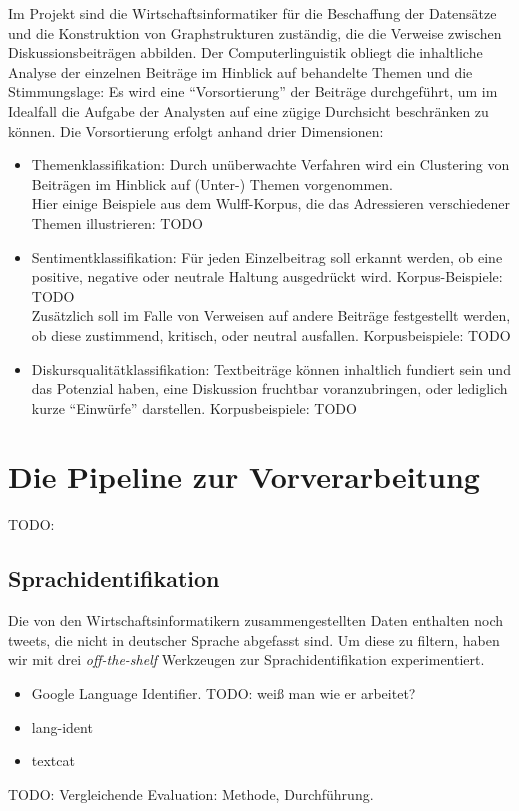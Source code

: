 \documentclass[11pt]{article}
\begin{document}
Im Projekt sind die Wirtschaftsinformatiker für die Beschaffung der
Datensätze und die Konstruktion von Graphstrukturen zuständig, die die
Verweise zwischen Diskussionsbeiträgen abbilden. Der
Computerlinguistik obliegt die inhaltliche Analyse der einzelnen
Beiträge im Hinblick auf behandelte Themen und die Stimmungslage: Es
wird eine ``Vorsortierung'' der Beiträge durchgeführt, um im Idealfall
die Aufgabe der Analysten auf eine zügige Durchsicht beschränken zu
können. Die Vorsortierung erfolgt anhand drier Dimensionen:
\begin{itemize}
\item Themenklassifikation: Durch unüberwachte Verfahren wird ein
  Clustering von Beiträgen im Hinblick auf (Unter-) Themen
  vorgenommen.\\ Hier einige Beispiele aus dem Wulff-Korpus, die das
  Adressieren verschiedener Themen illustrieren: TODO
\item Sentimentklassifikation: Für jeden Einzelbeitrag soll erkannt
  werden, ob eine positive, negative oder neutrale Haltung ausgedrückt
  wird. Korpus-Beispiele: TODO\\ Zusätzlich soll im Falle von Verweisen auf andere Beiträge
  festgestellt werden, ob diese zustimmend, kritisch, oder neutral
  ausfallen. Korpusbeispiele: TODO
\item Diskursqualitätklassifikation: Textbeiträge können inhaltlich
  fundiert sein und das Potenzial haben, eine Diskussion fruchtbar
  voranzubringen, oder lediglich kurze ``Einwürfe''
  darstellen. Korpusbeispiele: TODO
\end{itemize}


\section{Die Pipeline zur Vorverarbeitung}

TODO:
\subsection{Sprachidentifikation}

Die von den Wirtschaftsinformatikern zusammengestellten Daten
enthalten noch tweets, die nicht in deutscher Sprache abgefasst
sind. Um diese zu filtern, haben wir mit drei {\em off-the-shelf}
Werkzeugen zur Sprachidentifikation experimentiert.

\begin{itemize}
\item Google Language Identifier. TODO: weiß man wie er arbeitet?
\item lang-ident
\item textcat
\end{itemize}
TODO: Vergleichende Evaluation: Methode, Durchführung.
\end{document}
